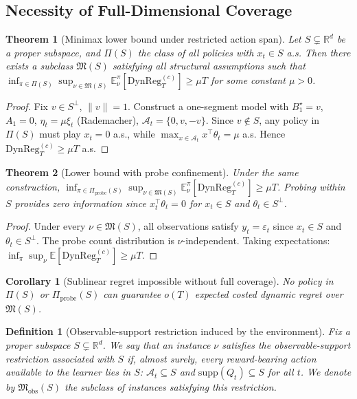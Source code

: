 \documentclass[11pt]{article}
\newcommand{\R}{\mathbb{R}}
\newcommand{\E}{\mathbb{E}}
\newcommand{\cA}{\mathcal{A}}
\newcommand{\DynReg}{\mathrm{DynReg}}
\newcommand{\supp}{\mathrm{supp}}
\newtheorem{definition}{Definition}
\newtheorem{theorem}{Theorem}
\newtheorem{corollary}{Corollary}
\begin{document}
\subsection{Necessity of Full-Dimensional Coverage}
\label{sec:coverage_lb}

\begin{theorem}[Minimax lower bound under restricted action span]
\label{thm:restricted_span_minimax_regret}
Let $S\subsetneq\R^d$ be a proper subspace, and $\Pi(S)$ the class of all policies
with $x_t\in S$ a.s.
Then there exists a subclass $\mathfrak{M}(S)$ satisfying all structural assumptions
such that
$\inf_{\pi\in\Pi(S)}\sup_{\nu\in\mathfrak{M}(S)}
\E_\nu^\pi[\DynReg_T^{(c)}]\ge\mu T$
for some constant $\mu>0$.
\end{theorem}

\begin{proof}
Fix $v\in S^\perp$, $\|v\|=1$.
Construct a one-segment model with $B_1^\star=v$, $A_1=0$,
$\eta_t=\mu\xi_t$ (Rademacher), $\cA_t=\{0,v,-v\}$.
Since $v\notin S$, any policy in $\Pi(S)$ must play $x_t=0$ a.s., while
$\max_{x\in\cA_t}x^\top\theta_t=\mu$ a.s.
Hence $\DynReg_T^{(c)}\ge\mu T$ a.s.
\end{proof}

\begin{theorem}[Lower bound with probe confinement]
\label{thm:restricted_span_minimax_regret_with_probe}
Under the same construction,
$\inf_{\pi\in\Pi_{\mathrm{probe}}(S)}
\sup_{\nu\in\mathfrak{M}(S)}\E_\nu^\pi[\DynReg_T^{(c)}]\ge\mu T$.
Probing within $S$ provides zero information since $x_t^\top\theta_t=0$ for
$x_t\in S$ and $\theta_t\in S^\perp$.
\end{theorem}

\begin{proof}
Under every $\nu\in\mathfrak{M}(S)$, all observations satisfy $y_t=\varepsilon_t$
since $x_t\in S$ and $\theta_t\in S^\perp$.
The probe count distribution is $\nu$-independent.
Taking expectations: $\inf_\pi\sup_\nu\E[\DynReg_T^{(c)}]\ge\mu T$.
\end{proof}

\begin{corollary}[Sublinear regret impossible without full coverage]
\label{cor:sublinear_impossible}
No policy in $\Pi(S)$ or $\Pi_{\mathrm{probe}}(S)$ can guarantee $o(T)$ expected
costed dynamic regret over $\mathfrak{M}(S)$.
\end{corollary}

\begin{definition}[Observable-support restriction induced by the environment]
\label{def:observable_support_restriction}
Fix a proper subspace $S\subsetneq \R^d$. We say that an instance $\nu$ satisfies the
observable-support restriction associated with $S$ if, almost surely, every reward-bearing
action available to the learner lies in $S$: $\cA_t \subseteq S$ and
$\supp(Q_t)\subseteq S$ for all $t$. We denote by $\mathfrak M_{\mathrm{obs}}(S)$ the
subclass of instances satisfying this restriction.
\end{definition}
\end{document}
